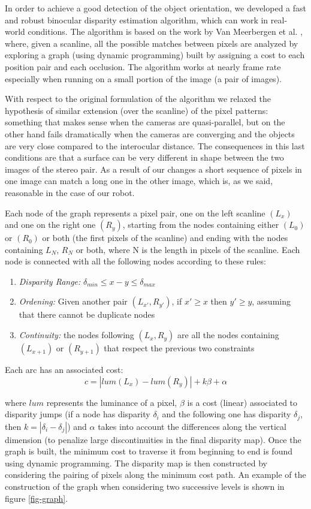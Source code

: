 In order to achieve a good detection of the object orientation, we developed a fast and robust binocular disparity estimation algorithm, which can work in real-world conditions.
The algorithm is based on the work by Van Meerbergen et al. \cite{merrbergen02stereo}, where, given a scanline, all the possible matches between pixels are analyzed by exploring a graph (using dynamic programming) built by assigning a cost to each position pair and each occlusion. The algorithm works at nearly frame rate especially when running on a small portion of the image (a pair of images). 

With respect to the original formulation of the algorithm we relaxed the hypothesis of similar extension (over the scanline) of the pixel patterns: something that makes sense when the cameras are quasi-parallel, but on the other hand fails dramatically when the cameras are converging and the objects are very close compared to the interocular distance.
The consequences in this last conditions are that a surface can be very different in shape between the two images of the stereo pair. As a result of our changes a short sequence of pixels in one image can match a long one in the other image, which is, as we said, reasonable in the case of our robot.

Each node of the graph represents a pixel pair, one on the left scanline $(L_x)$ and one on the right one $(R_y)$, starting from the nodes containing either $(L_0)$ or $(R_0)$ or both (the first pixels of the scanline) and ending with the nodes containing ${L_N}$, ${R_N}$ or both, where N is the length in pixels of the scanline. Each node is connected with all the following nodes according to these rules:

\begin{enumerate}
	\item \textit{Disparity Range:} $\delta_{min}\leq x-y \leq \delta_{max}$
	\item \textit{Ordening:} Given another pair $(L_{x'},R_{y'})$, if $x'\geq x$ then $y'\geq y$, assuming that there cannot be duplicate nodes
	\item \textit{Continuity:} the nodes following $(L_x,R_y)$ are all the nodes containing $(L_{x+1})$ or $(R_{y+1})$ that respect the previous two constraints
\end{enumerate}

\noindent Each arc has an associated cost:
	\[c=\left|lum(L_x)-lum(R_y)\right|+k\beta+\alpha
\]

\noindent where $lum$ represents the luminance of a pixel, $\beta$ is a cost (linear) associated to disparity jumps (if a node has disparity $\delta_i$ and the following one has disparity $\delta_j$, then $k=|\delta_i-\delta_j|$) and $\alpha$ takes into account the differences along the vertical dimension (to penalize large discontinuities in the final disparity map). Once the graph is built, the minimum cost to traverse it from beginning to end is found using dynamic programming. The disparity map is then constructed by considering the pairing of pixels along the minimum cost path. An example of the construction of the graph when considering two successive levels is shown in figure \ref{fig-graph}.

